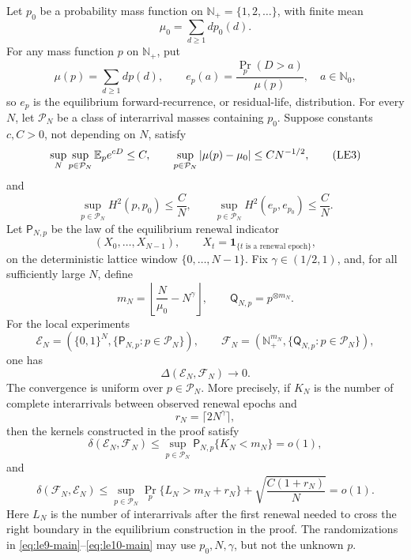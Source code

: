 \begin{theorem}
\label{thm:stationary-renewal-palm-equivalence-main}
Let \(p_0\) be a probability mass function on
\(\mathbb N_+=\{1,2,\ldots\}\), with finite mean
\[
 \mu_0=\sum_{d\ge1}d p_0(d).
\]
For any mass function \(p\) on \(\mathbb N_+\), put
\[
 \mu(p)=\sum_{d\ge1}d p(d),\qquad
 e_p(a)=\frac{\Pr_p(D>a)}{\mu(p)},\quad a\in\mathbb N_0,
\tag{LE2}\label{eq:le2-main}
\]
so \(e_p\) is the equilibrium forward-recurrence, or residual-life,
distribution.  For every \(N\), let \(\mathcal P_N\) be a class of
interarrival masses containing \(p_0\).  Suppose constants \(c,C>0\), not
depending on \(N\), satisfy
\[
 \sup_N\sup_{p\in\mathcal P_N}\mathbb E_p e^{cD}\le C,
 \qquad
 \sup_{p\in\mathcal P_N}|\mu(p)-\mu_0|\le C N^{-1/2},
\tag{LE3}\label{eq:le3-main}
\]
and
\[
 \sup_{p\in\mathcal P_N}H^2(p,p_0)\le \frac C N,
 \qquad
 \sup_{p\in\mathcal P_N}H^2(e_p,e_{p_0})\le \frac C N.
\tag{LE4}\label{eq:le4-main}
\]
Let \(\mathsf P_{N,p}\) be the law of the equilibrium renewal indicator
\[
 (X_0,\ldots,X_{N-1}),\qquad
 X_t=\mathbf1_{\{t\text{ is a renewal epoch}\}},
\tag{LE5}\label{eq:le5-main}
\]
on the deterministic lattice window \(\{0,\ldots,N-1\}\).  Fix
\(\gamma\in(1/2,1)\), and, for all sufficiently large \(N\), define
\[
 m_N=\left\lfloor\frac N{\mu_0}-N^\gamma\right\rfloor,
 \qquad \mathsf Q_{N,p}=p^{\otimes m_N}.
\tag{LE6}\label{eq:le6-main}
\]
For the local experiments
\[
 \mathcal E_N=(\{0,1\}^N,\{\mathsf P_{N,p}:p\in\mathcal P_N\}),
 \qquad
 \mathcal F_N=(\mathbb N_+^{m_N},
               \{\mathsf Q_{N,p}:p\in\mathcal P_N\}),
\]
one has
\[
 \Delta(\mathcal E_N,\mathcal F_N)\longrightarrow0.
\tag{LE7}\label{eq:le7-main}
\]
The convergence is uniform over \(p\in\mathcal P_N\).  More precisely, if
\(K_N\) is the number of complete interarrivals between observed renewal
epochs and
\[
 r_N=\lceil2N^\gamma\rceil,
\tag{LE8}\label{eq:le8-main}
\]
then the kernels constructed in the proof satisfy
\[
 \delta(\mathcal E_N,\mathcal F_N)
 \le \sup_{p\in\mathcal P_N}
       \mathsf P_{N,p}\{K_N<m_N\}=o(1),
\tag{LE9}\label{eq:le9-main}
\]
and
\[
 \delta(\mathcal F_N,\mathcal E_N)
 \le \sup_{p\in\mathcal P_N}
       \Pr_p\{L_N>m_N+r_N\}
       +\sqrt{\frac{C(1+r_N)}N}=o(1).
\tag{LE10}\label{eq:le10-main}
\]
Here \(L_N\) is the number of interarrivals after the first renewal needed
to cross the right boundary in the equilibrium construction in the proof.
The randomizations in \eqref{eq:le9-main}--\eqref{eq:le10-main} may use
\(p_0,N,\gamma\), but not the unknown \(p\).


\end{theorem}
